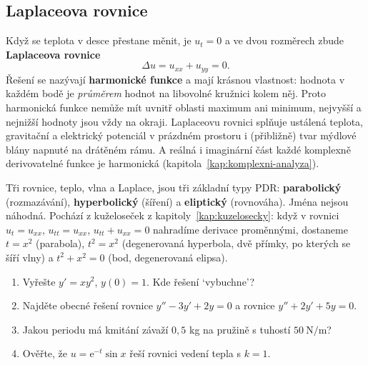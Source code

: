 \subsection{Laplaceova rovnice}

Když se teplota v desce přestane měnit, je $u_t = 0$ a ve dvou rozměrech zbude \textbf{Laplaceova rovnice}
\begin{equation*}
  \Delta u = u_{xx} + u_{yy} = 0.
\end{equation*}
Řešení se nazývají \textbf{harmonické funkce} a mají krásnou vlastnost: hodnota v každém bodě je \textit{průměrem} hodnot na libovolné kružnici kolem něj. Proto harmonická funkce nemůže mít uvnitř oblasti maximum ani minimum, nejvyšší a nejnižší hodnoty jsou vždy na okraji. Laplaceovu rovnici splňuje ustálená teplota, gravitační a elektrický potenciál v prázdném prostoru i (přibližně) tvar mýdlové blány napnuté na drátěném rámu. A reálná i imaginární část každé komplexně derivovatelné funkce je harmonická (kapitola~\ref{kap:komplexni-analyza}).

Tři rovnice, teplo, vlna a Laplace, jsou tři základní typy PDR: \textbf{parabolický} (rozmazávání), \textbf{hyperbolický} (šíření) a \textbf{eliptický} (rovnováha). Jména nejsou náhodná. Pochází z kuželoseček z kapitoly~\ref{kap:kuzelosecky}: když v rovnici $u_t = u_{xx}$, $u_{tt} = u_{xx}$, $u_{tt} + u_{xx} = 0$ nahradíme derivace proměnnými, dostaneme $t = x^2$ (parabola), $t^2 = x^2$ (degenerovaná hyperbola, dvě přímky, po kterých se šíří vlny) a $t^2 + x^2 = 0$ (bod, degenerovaná elipsa).

\begin{problem}
  \begin{enumerate}[label=(\alph*)]
    \item Vyřešte $y' = xy^2$, $y(0) = 1$. Kde řešení `vybuchne'?
    \item Najděte obecné řešení rovnice $y'' - 3y' + 2y = 0$ a rovnice $y'' + 2y' + 5y = 0$.
    \item Jakou periodu má kmitání závaží $0{,}5$ kg na pružině s tuhostí $50\ \mathrm{N}/\mathrm{m}$?
    \item Ověřte, že $u = \mathrm{e}^{-t}\sin x$ řeší rovnici vedení tepla s $k = 1$.
  \end{enumerate}
\end{problem}

